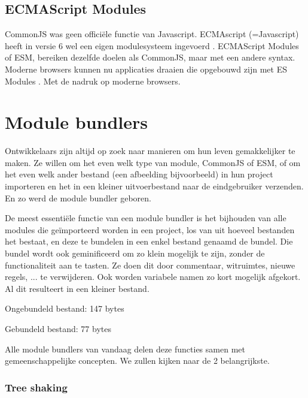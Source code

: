 

\subsection{ECMAScript Modules}

CommonJS was geen officiële functie van Javascript. ECMAscript (=Javascript) heeft in versie 6 wel een eigen modulesysteem ingevoerd \autocite{orendorff-2015}. ECMAScript Modules of ESM, bereiken dezelfde doelen als CommonJS, maar met een andere syntax. Moderne browsers kunnen nu applicaties draaien die opgebouwd zijn met ES Modules \autocite{mozilla-2021}. Met de nadruk op moderne browsers.





\section{Module bundlers}

Ontwikkelaars zijn altijd op zoek naar manieren om hun leven gemakkelijker te maken. Ze willen om het even welk type van module, CommonJS of ESM, of om het even welk ander bestand (een afbeelding bijvoorbeeld) in hun project importeren en het in een kleiner uitvoerbestand naar de eindgebruiker verzenden. En zo werd de module bundler geboren.

De meest essentiële functie van een module bundler is het bijhouden van alle modules die geïmporteerd worden in een project, los van uit hoeveel bestanden het bestaat, en deze te bundelen in een enkel bestand genaamd de bundel. Die bundel wordt ook geminificeerd om zo klein mogelijk te zijn, zonder de functionaliteit aan te tasten. Ze doen dit door commentaar, witruimtes, nieuwe regels, ... te verwijderen. Ook worden variabele namen zo kort mogelijk afgekort. Al dit resulteert in een kleiner bestand.

Ongebundeld bestand: 147 bytes

Gebundeld bestand: 77 bytes


Alle module bundlers van vandaag delen deze functies samen met gemeenschappelijke concepten. We zullen kijken naar de 2 belangrijkste. 

\subsubsection{Tree shaking}

